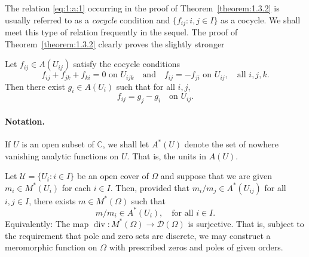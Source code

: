 The relation \eqref{eq:1:a:1} occurring in the proof of Theorem~\ref{theorem:1.3.2} is usually referred to as a \emph{cocycle} condition and $\{f_{ij}:i,j\in I\}$ as a cocycle. We shall meet this type of relation frequently in the sequel. The proof of Theorem~\ref{theorem:1.3.2} clearly proves the slightly stronger

 Let $f_{ij}\in A(U_{ij})$ satisfy the cocycle conditions
\[ f_{ij}+f_{jk}+f_{ki}=0\text{ on }U_{ijk}\quad\text{and}\quad f_{ij}=-f_{ji}\text{ on }U_{ij},\quad\text{all }i,j,k. \]
Then there exist $g_i\in A(U_i)$ such that for all $i,j$,
\[ f_{ij}=g_j-g_i\quad\text{on }U_{ij}. \]
\paragraph*{Notation.} If $U$ is an open subset of $\mathbb C$, we shall let $A^*(U)$ denote the set of nowhere vanishing analytic functions on $U$. That is, the units in $A(U)$.

 Let $\mathcal U=\{U_i:i\in I\}$ be an open cover of $\Omega$ and suppose that we are given $m_i\in M^*(U_i)$ for each $i\in I$. Then, provided that $m_i/m_j\in A^*(U_{ij})$ for all $i,j\in I$, there exists $m\in M^*(\Omega)$ such that
\[ m/m_i\in A^*(U_i),\quad\text{for all }i\in I. \]
Equivalently: The map $\operatorname{div}:M^*(\Omega)\to\mathcal D(\Omega)$ is surjective. That is, subject to the requirement that pole and zero sets are discrete, we may construct a meromorphic function on $\Omega$ with prescribed zeros and poles of given orders.

